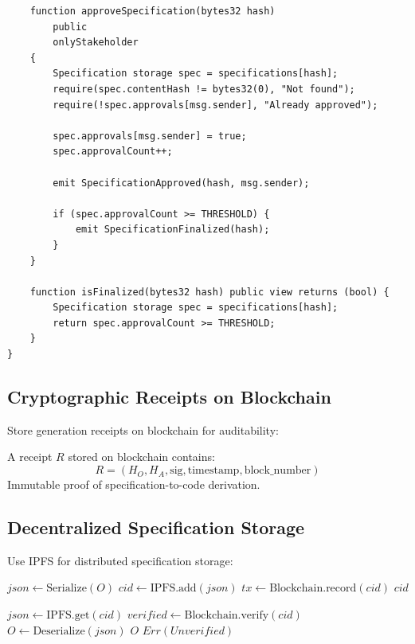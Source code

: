 \begin{verbatim}
    function approveSpecification(bytes32 hash)
        public
        onlyStakeholder
    {
        Specification storage spec = specifications[hash];
        require(spec.contentHash != bytes32(0), "Not found");
        require(!spec.approvals[msg.sender], "Already approved");

        spec.approvals[msg.sender] = true;
        spec.approvalCount++;

        emit SpecificationApproved(hash, msg.sender);

        if (spec.approvalCount >= THRESHOLD) {
            emit SpecificationFinalized(hash);
        }
    }

    function isFinalized(bytes32 hash) public view returns (bool) {
        Specification storage spec = specifications[hash];
        return spec.approvalCount >= THRESHOLD;
    }
}
\end{verbatim}

\subsection{Cryptographic Receipts on Blockchain}

Store generation receipts on blockchain for auditability:

\begin{definition}
    A receipt $R$ stored on blockchain contains:
    \begin{equation}
        R = (H_O, H_A, \text{sig}, \text{timestamp}, \text{block\_number})
    \end{equation}
    Immutable proof of specification-to-code derivation.
\end{definition}

\subsection{Decentralized Specification Storage}

Use IPFS for distributed specification storage:

\begin{algorithm}
\caption{IPFS-Based Specification Storage}
\begin{algorithmic}[1]
    \State $json \gets \text{Serialize}(O)$ 
    \State $cid \gets \text{IPFS.add}(json)$ 
    \State $tx \gets \text{Blockchain.record}(cid)$ 
    \State \Return $cid$
\EndProcedure

    \State $json \gets \text{IPFS.get}(cid)$ 
    \State $verified \gets \text{Blockchain.verify}(cid)$ 
        \State $O \gets \text{Deserialize}(json)$
        \State \Return $O$
    \Else
        \State \Return $Err(Unverified)$
    \EndIf
\EndProcedure
\end{algorithmic}
\end{algorithm}

